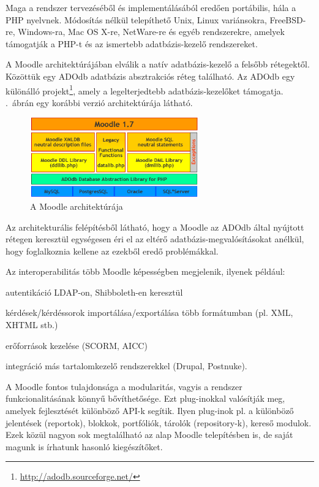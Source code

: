 Maga a rendszer tervezéséből és implementálásából eredően portábilis, hála a PHP nyelvnek. Módosítás nélkül telepíthető Unix, Linux variánsokra, FreeBSD-re, Windows-ra, Mac OS X-re, NetWare-re és egyéb rendszerekre, amelyek támogatják a PHP-t és az ismertebb adatbázis-kezelő rendszereket.

A Moodle architektúrájában elválik a natív adatbázis-kezelő a felsőbb rétegektől. Közöttük egy ADOdb adatbázis absztrakciós réteg található. Az ADOdb egy különálló projekt\footnote{\href{http://adodb.sourceforge.net/}{http://adodb.sourceforge.net/}}, amely a legelterjedtebb adatbázis-kezelőket támogatja. .~ábrán egy korábbi verzió architektúrája látható.

\begin{figure}[h!]
\centering
\includegraphics[width=0.65\textwidth]{figures/moodlearch.png}
\caption{A Moodle architektúrája \label{fig:moodlearch}}
\end{figure}

Az architekturális felépítésből látható, hogy a Moodle az ADOdb által nyújtott rétegen keresztül egységesen éri el az eltérő adatbázis-megvalósításokat anélkül, hogy foglalkoznia kellene az ezekből eredő problémákkal.  

Az interoperabilitás több Moodle képességben megjelenik, ilyenek például:
\begin{sajat_itemize}
\setlength{\itemsep}{0pt}
\item autentikáció LDAP-on, Shibboleth-en keresztül
\item kérdések/kérdéssorok importálása/exportálása több formátumban (pl. XML, XHTML stb.)
\item erőforrások kezelése (SCORM, AICC)
\item integráció más tartalomkezelő rendszerekkel (Drupal, Postnuke).
\end{sajat_itemize}

A Moodle fontos tulajdonsága a modularitás, vagyis a rendszer funkcionalitásának könnyű bővíthetősége. Ezt plug-inokkal valósítják meg, amelyek fejlesztését különböző API-k segítik. Ilyen plug-inok pl. a különböző jelentések (reportok), blokkok, portfóliók, tárolók (repository-k), kereső modulok. Ezek közül nagyon sok megtalálható az alap Moodle telepítésben is, de saját magunk is írhatunk hasonló kiegészítőket.

